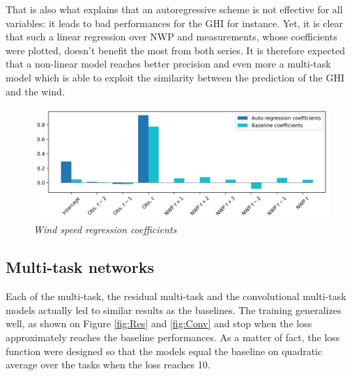 \documentclass{article}
\newcommand{\saut}{\vspace{10px}}
\begin{document}
\saut

That is also what explains that an autoregressive scheme
is not effective for all variables: it leads to bad performances for the GHI
for instance. Yet, it is clear that such a linear regression over NWP and measurements, whose coefficients were
plotted, doesn't benefit the most from both series. It is therefore expected that a non-linear model reaches
better precision and even more a multi-task model which is able to exploit the similarity between the prediction of
the GHI and the wind.


\saut

\begin{figure}[H]
    \centering
    \includegraphics[width=\linewidth]{img/coef.png}
    \caption{\textit{Wind speed regression coefficients}}
    \label{fig:Fig. 6}
\end{figure}

\subsection*{Multi-task networks}

Each of the multi-task, the residual multi-task and the convolutional multi-task models actually
led to similar results as the baselines. The training generalizes well,
as shown on Figure \ref{fig:Res} and \ref{fig:Conv} and stop
when the loss approximately reaches the baseline performances.
As a matter of fact, the loss function were designed so that the models equal the baseline on quadratic average
over the tasks when the loss reaches 10.

\saut
\end{document}
